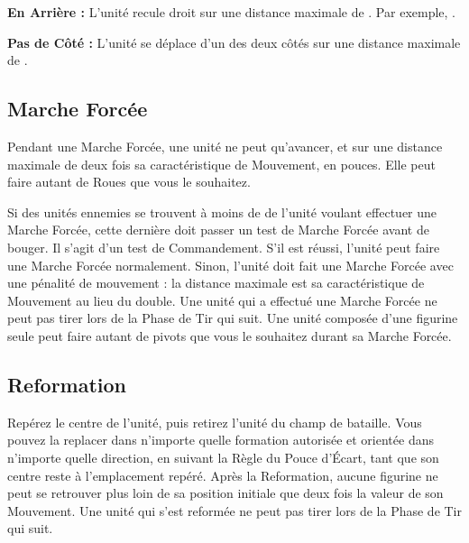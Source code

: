 \noindent\textbf{En Arrière :} L'unité recule droit sur une distance maximale de . Par exemple, .

\noindent\textbf{Pas de Côté :} L'unité se déplace d'un des deux côtés sur une distance maximale de .

\hypertarget{marchmove}{\subsection{Marche Forcée}}

Pendant une Marche Forcée, une unité ne peut qu'avancer, et sur une distance maximale de deux fois sa caractéristique de Mouvement, en pouces. Elle peut faire autant de Roues que vous le souhaitez. 

Si des unités ennemies se trouvent à moins de  de l'unité voulant effectuer une Marche Forcée, cette dernière doit passer un test de Marche Forcée avant de bouger. Il s'agit d'un test de Commandement. S'il est réussi, l'unité peut faire une Marche Forcée normalement. Sinon, l'unité doit fait une Marche Forcée avec une pénalité de mouvement : la distance maximale est sa caractéristique de Mouvement au lieu du double. Une unité qui a effectué une Marche Forcée ne peut pas tirer lors de la Phase de Tir qui suit. Une unité composée d'une figurine seule peut faire autant de pivots que vous le souhaitez durant sa Marche Forcée.

\hypertarget{reform}{\subsection{Reformation}}

Repérez le centre de l'unité, puis retirez l'unité du champ de bataille. Vous pouvez la replacer dans n'importe quelle formation autorisée et orientée dans n'importe quelle direction, en suivant la Règle du Pouce d'Écart, tant que son centre reste à l'emplacement repéré. Après la Reformation, aucune figurine ne peut se retrouver plus loin de sa position initiale que deux fois la valeur de son Mouvement. Une unité qui s'est reformée ne peut pas tirer lors de la Phase de Tir qui suit.

